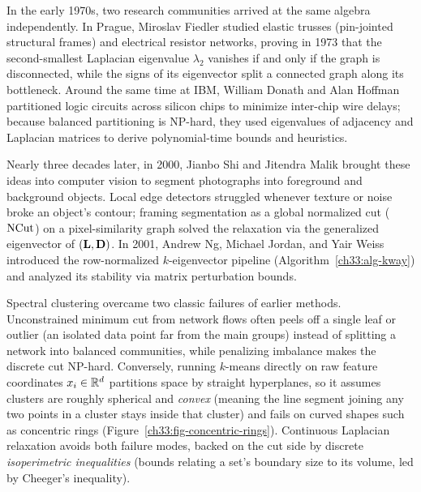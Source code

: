 \begin{historybox}
In the early 1970s, two research communities arrived at the same algebra independently. In Prague, Miroslav Fiedler studied elastic trusses (pin-jointed structural frames) and electrical resistor networks, proving in 1973 that the second-smallest Laplacian eigenvalue $\lambda_2$ vanishes if and only if the graph is disconnected, while the signs of its eigenvector split a connected graph along its bottleneck. Around the same time at IBM, William Donath and Alan Hoffman partitioned logic circuits across silicon chips to minimize inter-chip wire delays; because balanced partitioning is NP-hard, they used eigenvalues of adjacency and Laplacian matrices to derive polynomial-time bounds and heuristics.

Nearly three decades later, in 2000, Jianbo Shi and Jitendra Malik brought these ideas into computer vision to segment photographs into foreground and background objects. Local edge detectors struggled whenever texture or noise broke an object's contour; framing segmentation as a global normalized cut ($\operatorname{NCut}$) on a pixel-similarity graph solved the relaxation via the generalized eigenvector of $(\mathbf{L}, \mathbf{D})$. In 2001, Andrew Ng, Michael Jordan, and Yair Weiss introduced the row-normalized $k$-eigenvector pipeline (Algorithm~\ref{ch33:alg-kway}) and analyzed its stability via matrix perturbation bounds.

Spectral clustering overcame two classic failures of earlier methods. Unconstrained minimum cut from network flows often peels off a single leaf or outlier (an isolated data point far from the main groups) instead of splitting a network into balanced communities, while penalizing imbalance makes the discrete cut NP-hard. Conversely, running $k$-means directly on raw feature coordinates $x_i \in \mathbb{R}^d$ partitions space by straight hyperplanes, so it assumes clusters are roughly spherical and \emph{convex} (meaning the line segment joining any two points in a cluster stays inside that cluster) and fails on curved shapes such as concentric rings (Figure~\ref{ch33:fig-concentric-rings}). Continuous Laplacian relaxation avoids both failure modes, backed on the cut side by discrete \emph{isoperimetric inequalities} (bounds relating a set's boundary size to its volume, led by Cheeger's inequality).
\end{historybox}

